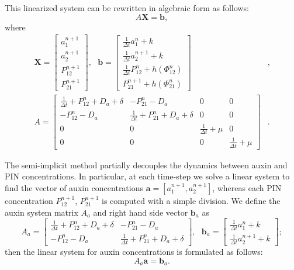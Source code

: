 This linearized system can be rewritten in algebraic form as follows:
\begin{equation}
  A \mathbf{X} = \mathbf{b},
\end{equation}
where
\begin{equation}\begin{aligned}
  \mathbf{X} = \begin{bmatrix} a_1^{n+1} \\  a_2^{n+1} \\ P_{12}^{n+1} \\P_{21}^{n+1} \end{bmatrix}  , \ \ \ \mathbf{b} = \begin{bmatrix}  \frac{1}{\Delta t}a_1^{n} + k \\ \frac{1}{\Delta t} a_2^{n+1} + k \\ \frac{1}{\Delta t} P_{12}^{n} + h\left(\Phi_{12}^n \right) \\P_{21}^{n+1} + h\left(\Phi_{21}^n \right)\end{bmatrix}&, \\[6pt]
 A = \begin{bmatrix} \frac{1}{\Delta t} + P_{12}^n + D_a + \delta & -P_{21}^n - D_a & 0 & 0 \\
  -P_{12}^n - D_a  & \frac{1}{\Delta t} + P_{21}^n + D_a + \delta & 0 & 0 \\
  0 & 0 & \frac{1}{\Delta t} + \mu & 0 \\
  0 & 0 & 0 & \frac{1}{\Delta t} + \mu  \end{bmatrix}&.
\end{aligned}\end{equation}

The semi-implicit method partially decouples the dynamics between auxin and PIN concentrations. In particular, at each time-step we solve a linear system to find the vector of auxin concentrations $\mathbf{a} = \left[a_1^{n+1}, a_2^{n+1} \right]$, whereas each PIN concentration $P_{12}^{n+1}$, $P_{21}^{n+1}$ is computed with a simple division.
We define the auxin system matrix $A_a$ and right hand side vector $\mathbf{b}_a$ as
\begin{equation}
  A_a = \begin{bmatrix} \frac{1}{\Delta t} + P_{12}^n + D_a + \delta & -P_{21}^n - D_a \\ -P_{12}^n - D_a  & \frac{1}{\Delta t} + P_{21}^n + D_a + \delta   \end{bmatrix}, \ \ \  \mathbf{b}_a =  \begin{bmatrix}  \frac{1}{\Delta t}a_1^{n} + k \\ \frac{1}{\Delta t} a_2^{n+1} + k \end{bmatrix};
\end{equation}
then the linear system for auxin concentrations is formulated as follows:
\begin{equation} \label{eq:aux_linsys}
  A_a \mathbf{a} = \mathbf{b}_a.
\end{equation}

